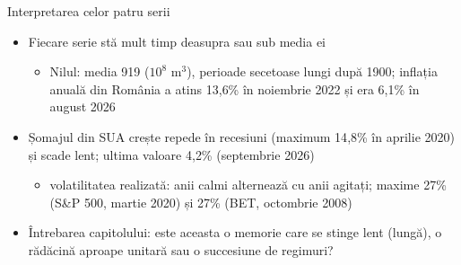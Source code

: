 \begin{frame}{Interpretarea celor patru serii}
\itemsize{\small}
\begin{itemize}
    \item Fiecare serie stă mult timp deasupra sau sub media ei
    \begin{itemize}
        \item Nilul: media 919 ($10^8$ m$^3$), perioade secetoase lungi după 1900; inflația anuală din România a atins 13{,}6\% în noiembrie 2022 și era 6{,}1\% în august 2026
    \end{itemize}
    \item Șomajul din SUA crește repede în recesiuni (maximum 14{,}8\% în aprilie 2020) și scade lent; ultima valoare 4{,}2\% (septembrie 2026)
    \begin{itemize}
        \item volatilitatea realizată: anii calmi alternează cu anii agitați; maxime 27\% (S\&P 500, martie 2020) și 27\% (BET, octombrie 2008)
    \end{itemize}
    \item Întrebarea capitolului: este aceasta o memorie care se stinge lent (lungă), o rădăcină aproape unitară sau o succesiune de regimuri?
\end{itemize}
\end{frame}

